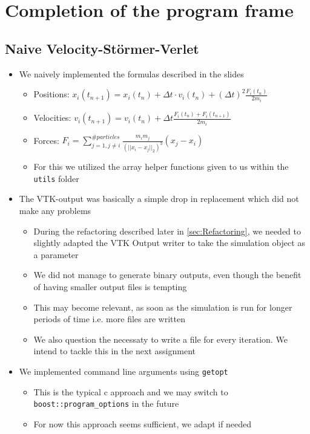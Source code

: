 \documentclass{article}
\begin{document}
\section{Completion of the program frame}

\subsection{Naive Velocity-Störmer-Verlet}
\begin{itemize}
    \item We naively implemented the formulas described in the slides
    \begin{itemize}
        \item Positions: $x_i(t_{n+1}) = x_i(t_{n}) + \Delta t \cdot v_i(t_n) + (\Delta t )^2 \frac{F_i(t_n)}{2m_i}$
        \item Velocities: $v_i(t_{n+1}) = v_i(t_n) + \Delta t \frac{F_i(t_n) + F_i(t_{n+1})}{2m_i}$
        \item Forces: $F_i = \sum_{j=1, j \neq i}^{\#particles}
        \frac{m_im_j}{(||x_i-x_j||_2)^3} (x_j - x_i) $
        \item For this we utilized the array helper functions given to us within the \verb|utils| folder
    \end{itemize}
    \item The VTK-output was basically a simple drop in replacement which did not make any problems
    \begin{itemize}
        \item During the refactoring described later in \ref{sec:Refactoring}, we needed to slightly adapted the VTK Output writer to take the simulation object as a parameter
        \item We did not manage to generate binary outputs, even though the benefit of having smaller output files is tempting
        \item This may become relevant, as soon as the simulation is run for longer periods of time i.e. more files are written
        \item We also question the necessaty to write a file for every iteration. We intend to tackle this in the next assignment
    \end{itemize}
    \item We implemented command line arguments using \verb|getopt|
    \begin{itemize}
        \item This is the typical c approach and we may switch to \verb|boost::program_options| in the future
        \item For now this approach seems sufficient, we adapt if needed
    \end{itemize}
\end{itemize}
\end{document}
